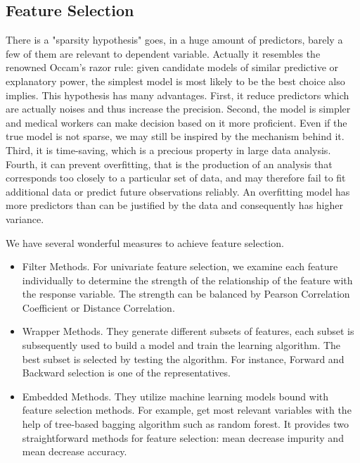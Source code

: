 \documentclass[]{article}
\begin{document}
\subsection{Feature Selection}
There is a "sparsity hypothesis"\cite{ning2017general} goes, in a huge amount of predictors, barely a few of them are relevant to dependent variable. Actually it resembles the renowned Occam's razor rule\cite{gregg1984krashen}: given candidate models of similar predictive or explanatory power, the simplest model is most likely to be the best choice also implies. This hypothesis has many advantages. First, it reduce predictors which are actually noises and thus increase the precision. Second, the model is simpler and medical workers can make decision based on it more proficient. Even if the true model is not sparse, we may still be inspired by the mechanism behind it. Third, it is time-saving, which is a precious property in large data analysis. Fourth, it can prevent overfitting, that is the production of an analysis that corresponds too closely to a particular set of data, and may therefore fail to fit additional data or predict future observations reliably. An overfitting model has more predictors than can be justified by the data and consequently has higher variance.

We have several wonderful measures to achieve feature selection. 
\begin{itemize}
	\item Filter Methods. For univariate feature selection, we examine each feature individually to determine the strength of the relationship of the feature with the response variable. The strength can be balanced by Pearson Correlation Coefficient\cite{benesty2009pearson} or Distance Correlation.
	\item Wrapper Methods. They generate different subsets of features, each subset is subsequently used to build a model and train the learning algorithm. The best subset is selected by testing the algorithm. For instance, Forward and Backward selection\cite{morpurgo1963forward} is one of the representatives.
	\item Embedded Methods. They utilize machine learning models bound with feature selection methods. For example, get most relevant variables with the help of tree-based bagging algorithm such as random forest\cite{liaw2002classification}. It provides two straightforward methods for feature selection: mean decrease impurity and mean decrease accuracy\cite{louppe2013understanding}.
\end{itemize}
\end{document}
